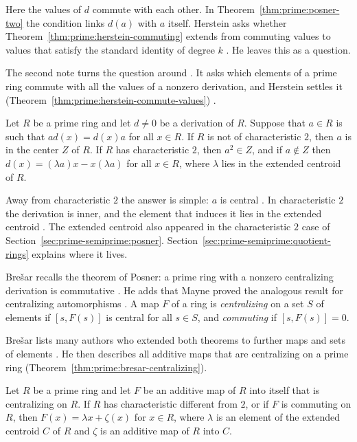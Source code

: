 Here the values of $d$ commute with each other. In
Theorem~\ref{thm:prime:posner-two} the condition links $d(a)$ with $a$ itself.
Herstein asks whether Theorem~\ref{thm:prime:herstein-commuting} extends from
commuting values to values that satisfy the standard identity of degree $k$
\cite[p.~370]{Herstein1978}. He leaves this as a question.

The second note turns the question around \cite[p.~509]{Herstein1979}. It asks which elements of a prime ring commute with all the values of a nonzero derivation, and Herstein settles it (Theorem~\ref{thm:prime:herstein-commute-values}) \cite[p.~509]{Herstein1979}.

\begin{theorem}\label{thm:prime:herstein-commute-values}
Let $R$ be a prime ring and let $d\neq 0$ be a derivation of $R$. Suppose that
$a\in R$ is such that $ad(x)=d(x)a$ for all $x\in R$. If $R$ is not of
characteristic $2$, then $a$ is in the center $Z$ of $R$. If $R$ has
characteristic $2$, then $a^2\in Z$, and if $a\notin Z$ then $d(x)=(\lambda
a)x-x(\lambda a)$ for all $x\in R$, where $\lambda$ lies in the extended centroid
of $R$.
\end{theorem}

Away from characteristic $2$ the answer is simple: $a$ is central
\cite[p.~509]{Herstein1979}. In characteristic $2$ the derivation is inner, and
the element that induces it lies in the extended centroid
\cite[p.~509]{Herstein1979}. The extended centroid also appeared in the
characteristic $2$ case of Section~\ref{sec:prime-semiprime:posner}.
Section~\ref{sec:prime-semiprime:quotient-rings} explains where it lives.

Bre\v{s}ar recalls the theorem of Posner: a prime ring with a nonzero
centralizing derivation is commutative \cite[p.~385]{Bresar1993}. He adds that
Mayne proved the analogous result for centralizing automorphisms
\cite[p.~113]{Mayne1976Centralizing}. A map $F$ of a
ring is \emph{centralizing} on a set $S$ of elements if $[s,F(s)]$ is central
for all $s\in S$, and \emph{commuting} if $[s,F(s)]=0$.

Bre\v{s}ar lists many authors who extended both theorems to further maps and
sets of elements \cite[p.~385]{Bresar1993}. He then describes all additive maps
that are centralizing on a prime ring (Theorem~\ref{thm:prime:bresar-centralizing}).

\begin{theorem}\label{thm:prime:bresar-centralizing}
Let $R$ be a prime ring and let $F$ be an additive map of $R$ into itself that
is centralizing on $R$. If $R$ has characteristic different from $2$, or if $F$
is commuting on $R$, then $F(x)=\lambda x+\zeta(x)$ for $x\in R$, where $\lambda$
is an element of the extended centroid $C$ of $R$ and $\zeta$ is an additive map
of $R$ into $C$.
\end{theorem}

